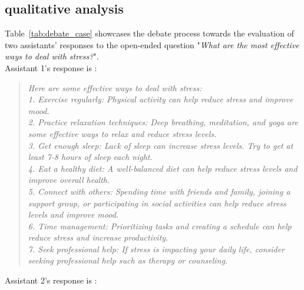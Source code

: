 \subsection{qualitative analysis}\label{subsec:qualitative}

Table~\ref{tab:debate_case} showcases the debate process towards the evaluation of two assistants' responses to the open-ended question "\textit{What are the most effective ways to deal with stress?}". \\
Assistant 1's response is :
\begin{quote}
\textit{Here are some effective ways to deal with stress: \\
1. Exercise regularly: Physical activity can help reduce stress and improve mood. \\
2. Practice relaxation techniques: Deep breathing, meditation, and yoga are some effective ways to relax and reduce stress levels. \\
3. Get enough sleep: Lack of sleep can increase stress levels. Try to get at least 7-8 hours of sleep each night. \\
4. Eat a healthy diet: A well-balanced diet can help reduce stress levels and improve overall health. \\
5. Connect with others: Spending time with friends and family, joining a support group, or participating in social activities can help reduce stress levels and  improve mood. \\
6. Time management: Prioritizing tasks and creating a schedule can help reduce stress and increase productivity. \\
7. Seek professional help: If stress is impacting your daily life, consider seeking professional help such as therapy or counseling. \\}
\end{quote}
Assistant 2's response is :
